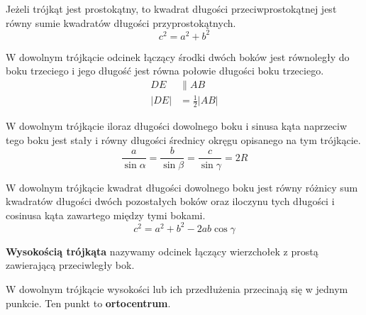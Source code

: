 \begin{theorem}
  Jeżeli trójkąt jest prostokątny, to kwadrat długości przeciwprostokątnej jest równy sumie kwadratów
  długości przyprostokątnych.
  \begin{equation}
    c^2 = a^2 + b^2
  \end{equation}
\end{theorem}

\begin{theorem}
  W dowolnym trójkącie odcinek łączący środki dwóch boków jest równoległy do boku trzeciego i jego
  długość jest równa połowie długości boku trzeciego.
  \begin{equation}
    \begin{aligned}
      DE &\parallel AB\\
      |DE| &= \frac 1 2 |AB|
    \end{aligned}
  \end{equation}
\end{theorem}

\begin{theorem}
  W dowolnym trójkącie iloraz długości dowolnego boku i sinusa kąta naprzeciw tego boku jest stały i
  równy długości średnicy okręgu opisanego na tym trójkącie.
  \begin{equation}
    \frac{a}{\sin \alpha} = \frac{b}{\sin \beta} = \frac{c}{\sin \gamma} = 2R
  \end{equation}
\end{theorem}

\begin{theorem}
  W dowolnym trójkącie kwadrat długości dowolnego boku jest równy różnicy sum kwadratów długości
  dwóch pozostałych boków oraz iloczynu tych długości i cosinusa kąta zawartego między tymi bokami.
  \begin{equation}
    c^2 = a^2 + b^2 - 2ab \cos \gamma
  \end{equation}
\end{theorem}

\begin{definition}
  \textbf{Wysokością trójkąta} nazywamy odcinek łączący wierzchołek z prostą zawierającą przeciwległy bok.
\end{definition}

\begin{theorem}
  W dowolnym trójkącie wysokości lub ich przedłużenia przecinają się w jednym punkcie. Ten punkt to
  \textbf{ortocentrum}.
\end{theorem}

